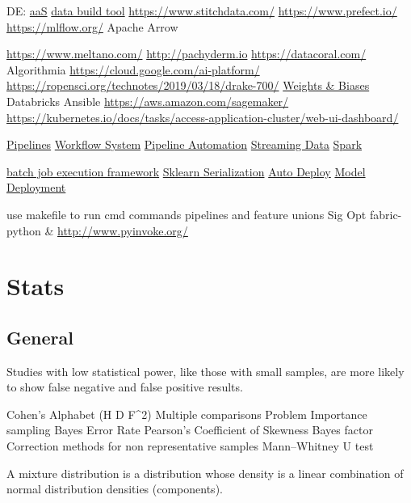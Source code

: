 \documentclass[]{book}
\begin{document}
DE: \href{https://www.astronomer.io/}{aaS} \href{https://www.getdbt.com/}{data build tool} \url{https://www.stitchdata.com/} \url{https://www.prefect.io/} \url{https://mlflow.org/} Apache Arrow

\url{https://www.meltano.com/} \url{http://pachyderm.io} \url{https://datacoral.com/} Algorithmia \url{https://cloud.google.com/ai-platform/} \url{https://ropensci.org/technotes/2019/03/18/drake-700/} \href{https://www.wandb.com/blog/towards-reproducibility}{Weights \& Biases} Databricks Ansible \url{https://aws.amazon.com/sagemaker/} \url{https://kubernetes.io/docs/tasks/access-application-cluster/web-ui-dashboard/}

\href{http://stat545.com/automation01_slides/\#/automating-data-analysis-pipelines}{Pipelines} \href{https://snakemake.readthedocs.io/en/stable/}{Workflow System} \href{http://stat545.com/automation01_slides/\#/automating-data-analysis-pipelines}{Pipeline Automation} \href{https://www.wallaroolabs.com}{Streaming Data} \href{https://docs.azuredatabricks.net/spark/latest/mllib/mllib-pipelines-and-stuctured-streaming.html}{Spark}

\href{https://stitchfix.github.io/flotilla-os/}{batch job execution framework} \href{https://cmry.github.io/notes/serialize}{Sklearn Serialization} \href{http://content.nexosis.com/twimlai}{Auto Deploy} \href{https://orchestrahq.com}{Model Deployment}

use makefile to run cmd commands pipelines and feature unions Sig Opt fabric-python \& \url{http://www.pyinvoke.org/}

\hypertarget{stats}{%
\chapter{Stats}\label{stats}}

\hypertarget{general-3}{%
\section{General}\label{general-3}}

Studies with low statistical power, like those with small samples, are more likely to show false negative and false positive results.

Cohen's Alphabet (H D F\^{}2) Multiple comparisons Problem Importance sampling Bayes Error Rate Pearson's Coefficient of Skewness Bayes factor Correction methods for non representative samples Mann--Whitney U test

A mixture distribution is a distribution whose density is a linear combination of normal distribution densities (components).
\end{document}
